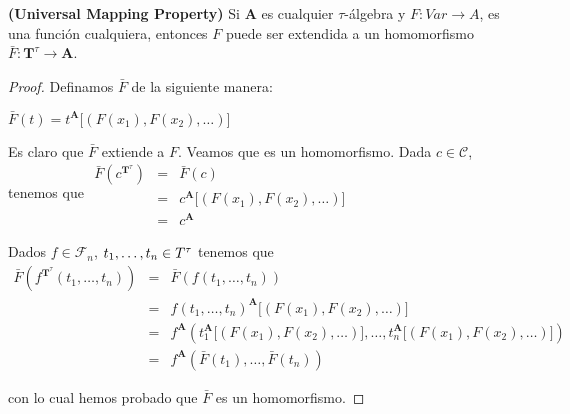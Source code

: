  \begin{lemma}
    \PN \textbf{(Universal Mapping Property)} Si $\mathbf{A}$ es cualquier $\tau$-álgebra y $F: Var \rightarrow A$, es
    una función cualquiera, entonces $F$ puede ser extendida a un homomorfismo $\bar{F}: \mathbf{T}^{\tau} \rightarrow
    \mathbf{A}$.
  \end{lemma}
  \begin{proof}
    Definamos $\bar{F}$ de la siguiente manera:

    $\displaystyle \bar{F}(t)=t^{\mathbf{A}}\lbrack(F(x_{1}),F(x_{2}),\dotsc)\rbrack $

    Es claro que $\bar{F}$ extiende a $F$. Veamos que es un homomorfismo. Dada $ c\in \mathcal{C}$, tenemos que
    $\displaystyle \begin{array}{lll} \bar{F}(c^{\mathbf{T}^{\tau }}) & = & \bar{F}(c) \\ & = & c^{\mathbf{A}}\lbrack(F(x_{1}),F(x_{2}),\dotsc)\rbrack \\ & = & c^{\mathbf{A}} \end{array} $

    Dados $f\in \mathcal{F}_{n}$, $t_{1}, \dotsc, t_{n}\in T^{\tau}$ tenemos que
    $\displaystyle \begin{array}{lll} \bar{F}(f^{\mathbf{T}^{\tau }}(t_{1}, \dotsc, t_{n})) & = & \bar{F} (f(t_{1}, \dotsc, t_{n})) \\ & = & f(t_{1}, \dotsc, t_{n})^{\mathbf{A}}\lbrack(F(x_{1}),F(x_{2}),\dotsc)\rbrack \\ & = & f^{\mathbf{A}}(t_{1}^{\mathbf{A}}\lbrack(F(x_{1}),F(x_{2}),\dotsc)\rbrack, \dotsc, t_{n}^{ \mathbf{A}}\lbrack(F(x_{1}),F(x_{2}),\dotsc)\rbrack) \\ & = & f^{\mathbf{A}}(\bar{F}(t_{1}), \dotsc, \bar{F}(t_{n})) \end{array} $

    con lo cual hemos probado que $\bar{F}$ es un homomorfismo.
  \end{proof}

